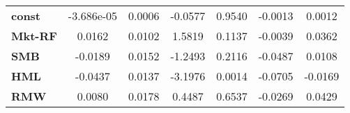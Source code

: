 \begin{center}
\begin{tabular}{lcccccc}
\midrule
\textbf{const}  &     -3.686e-05     &       0.0006       &     -0.0577     &      0.9540      &      -0.0013      &       0.0012       \\
\textbf{Mkt-RF} &       0.0162       &       0.0102       &      1.5819     &      0.1137      &      -0.0039      &       0.0362       \\
\textbf{SMB}    &      -0.0189       &       0.0152       &     -1.2493     &      0.2116      &      -0.0487      &       0.0108       \\
\textbf{HML}    &      -0.0437       &       0.0137       &     -3.1976     &      0.0014      &      -0.0705      &      -0.0169       \\
\textbf{RMW}    &       0.0080       &       0.0178       &      0.4487     &      0.6537      &      -0.0269      &       0.0429       \\
\bottomrule
\end{tabular}
\end{center}
